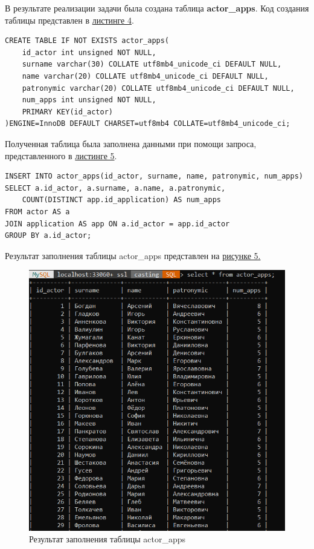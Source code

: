\documentclass[11pt,a4paper,final]{article} %
\begin{document}
\par В результате реализации задачи была создана таблица \textbf{actor\_apps}. Код создания таблицы представлен в
\hyperref[lst:l4]{листинге 4}.

\begin{lstlisting}[caption={Код создания таблицы actor\_apps}, label=lst:l4]
CREATE TABLE IF NOT EXISTS actor_apps(
	id_actor int unsigned NOT NULL,
	surname varchar(30) COLLATE utf8mb4_unicode_ci DEFAULT NULL,
	name varchar(20) COLLATE utf8mb4_unicode_ci DEFAULT NULL,
	patronymic varchar(20) COLLATE utf8mb4_unicode_ci DEFAULT NULL,
	num_apps int unsigned NOT NULL, 
	PRIMARY KEY(id_actor)
)ENGINE=InnoDB DEFAULT CHARSET=utf8mb4 COLLATE=utf8mb4_unicode_ci;
\end{lstlisting} 

Полученная таблица была заполнена данными при помощи запроса, представленного в \hyperref[lst:l5]{листинге 5}.

\begin{lstlisting}[caption={Код заполнения таблицы actor\_apps}, label=lst:l5]
INSERT INTO actor_apps(id_actor, surname, name, patronymic, num_apps)
SELECT a.id_actor, a.surname, a.name, a.patronymic, 
	COUNT(DISTINCT app.id_application) AS num_apps
FROM actor AS a
JOIN application AS app ON a.id_actor = app.id_actor
GROUP BY a.id_actor; 
\end{lstlisting}

Результат заполнения таблицы actor\_apps представлен на \hyperref[fig:pic5]{рисунке 5.}

\begin{figure}[H]
	\centering
	\includegraphics[width=0.9\linewidth]{pic5.png}
	\caption{Результат заполнения таблицы actor\_apps}
	\label{fig:pic5}
\end{figure}
\end{document}
